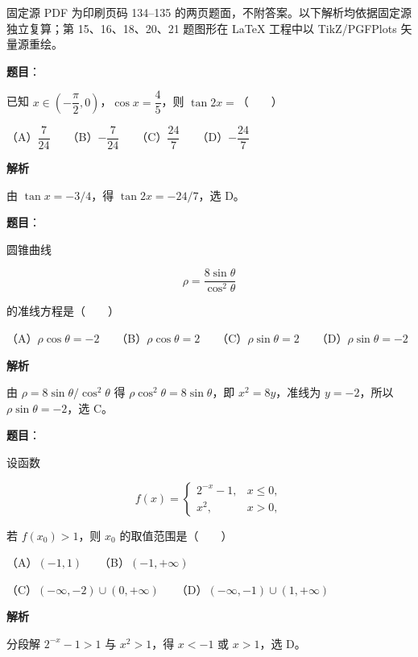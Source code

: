 

\begin{gktip}
固定源 PDF 为印刷页码 134–135 的两页题面，不附答案。以下解析均依据固定源独立复算；第 15、16、18、20、21 题图形在 LaTeX 工程中以 TikZ/PGFPlots 矢量源重绘。
\end{gktip}


\begin{answer}

\textbf{题目}：

已知 $x\in\left(-\dfrac\pi2,0\right)$，$\cos x=\dfrac45$，则 $\tan2x=$\mbox{（　　）}

（A）$\dfrac7{24}$　　（B）$-\dfrac7{24}$　　（C）$\dfrac{24}{7}$　　（D）$-\dfrac{24}{7}$

\textbf{解析}

由 $\tan x=-3/4$，得 $\tan2x=-24/7$，选 D。


\end{answer}
\begin{answer}

\textbf{题目}：

圆锥曲线

\nopagebreak[4]
\[
\rho=\frac{8\sin\theta}{\cos^2\theta}
\]

的准线方程是\mbox{（　　）}

（A）$\rho\cos\theta=-2$　　（B）$\rho\cos\theta=2$　　（C）$\rho\sin\theta=2$　　（D）$\rho\sin\theta=-2$

\textbf{解析}

由 $\rho=8\sin\theta/\cos^2\theta$ 得 $\rho\cos^2\theta=8\sin\theta$，即 $x^2=8y$，准线为 $y=-2$，所以 $\rho\sin\theta=-2$，选 C。


\end{answer}
\begin{answer}

\textbf{题目}：

设函数

\nopagebreak[4]
\[
f(x)=
\begin{cases}
2^{-x}-1,&x\leqslant0,\\
x^2,&x>0,
\end{cases}
\]

若 $f(x_0)>1$，则 $x_0$ 的取值范围是\mbox{（　　）}

（A）$(-1,1)$　　（B）$(-1,+\infty)$

（C）$(-\infty,-2)\cup(0,+\infty)$　　（D）$(-\infty,-1)\cup(1,+\infty)$

\textbf{解析}

分段解 $2^{-x}-1>1$ 与 $x^2>1$，得 $x<-1$ 或 $x>1$，选 D。


\end{answer}
